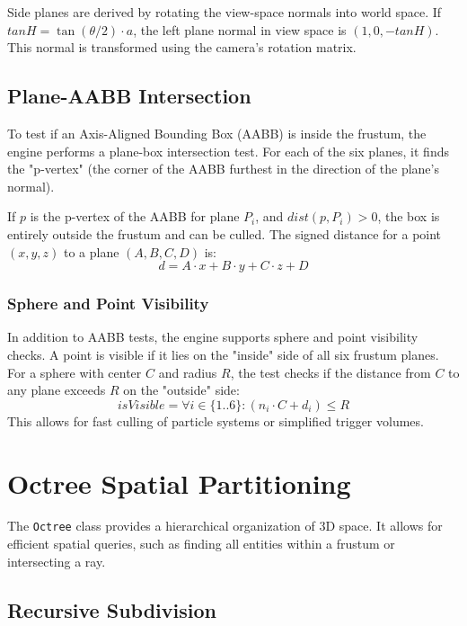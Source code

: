 Side planes are derived by rotating the view-space normals into world space. If $tanH = \tan(\theta/2) \cdot a$, the left plane normal in view space is $(1, 0, -tanH)$. This normal is transformed using the camera's rotation matrix.

\subsection{Plane-AABB Intersection}

To test if an Axis-Aligned Bounding Box (AABB) is inside the frustum, the engine performs a plane-box intersection test. For each of the six planes, it finds the "p-vertex" (the corner of the AABB furthest in the direction of the plane's normal).

If $p$ is the p-vertex of the AABB for plane $P_i$, and $dist(p, P_i) > 0$, the box is entirely outside the frustum and can be culled. The signed distance for a point $(x, y, z)$ to a plane $(A, B, C, D)$ is:
\begin{equation}
    d = A \cdot x + B \cdot y + C \cdot z + D
\end{equation}

\subsubsection{Sphere and Point Visibility}
In addition to AABB tests, the engine supports sphere and point visibility checks. A point is visible if it lies on the "inside" side of all six frustum planes. For a sphere with center $C$ and radius $R$, the test checks if the distance from $C$ to any plane exceeds $R$ on the "outside" side:
\begin{equation}
    isVisible = \forall i \in \{1..6\}: (n_i \cdot C + d_i) \leq R
\end{equation}
This allows for fast culling of particle systems or simplified trigger volumes.

\section{Octree Spatial Partitioning}

The \texttt{Octree} class provides a hierarchical organization of 3D space. It allows for efficient spatial queries, such as finding all entities within a frustum or intersecting a ray.

\subsection{Recursive Subdivision}

